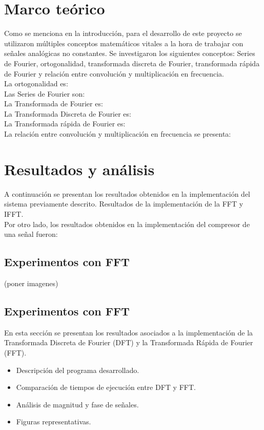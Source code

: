 \documentclass[12pt, journal]{IEEEtran}
\begin{document}
\section{Marco teórico}
Como se menciona en la introducción, para el desarrollo de este proyecto se utilizaron múltiples conceptos matemáticos vitales a la hora de trabajar con señales analógicas no constantes. Se investigaron los siguientes conceptos: Series de Fourier, ortogonalidad, transformada discreta de Fourier, transformada rápida de Fourier y relación entre convolución y multiplicación en frecuencia. \\
La ortogonalidad es:\\
Las Series de Fourier son:\\
La Transformada de Fourier es:\\
La Transformada Discreta de Fourier es:\\
La Transformada rápida de Fourier es:\\
La relación entre convolución y multiplicación en frecuencia se presenta:\\

\section{Resultados y análisis}

A continuación se presentan los resultados obtenidos en la implementación del sistema previamente descrito.
Resultados de la implementación de la FFT y IFFT.\\

Por otro lado, los resultados obtenidos en la implementación del compresor de una señal fueron: 
\subsection{Experimentos con FFT}
(poner imagenes)

\subsection{Experimentos con FFT}
En esta sección se presentan los resultados asociados a la implementación de la Transformada Discreta de Fourier (DFT) y la Transformada Rápida de Fourier (FFT). 

\begin{itemize}
    \item Descripción del programa desarrollado.
    \item Comparación de tiempos de ejecución entre DFT y FFT.
    \item Análisis de magnitud y fase de señales.
    \item Figuras representativas.
\end{itemize}
\end{document}

